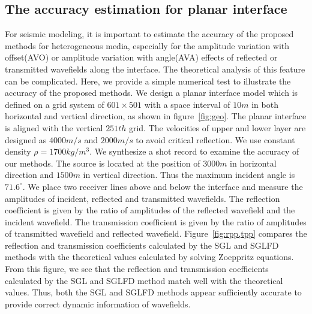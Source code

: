 \subsection{The accuracy estimation for planar interface}
For seismic modeling, it is important to estimate the accuracy of the proposed methods for heterogeneous media, especially for the amplitude variation with offset(AVO) or amplitude variation with angle(AVA) effects of reflected or transmitted wavefields along the interface. The theoretical analysis of this feature can be complicated. Here, we provide a simple numerical test to illustrate the accuracy of the proposed methods. We design a planar interface model which is defined on a grid system of $601\times501$ with a space interval of $10m$ in both horizontal and vertical direction, as shown in figure~\ref{fig:geo}. The planar interface is aligned with the vertical $251th$ grid. The velocities of upper and lower layer are designed as $4000m/s$ and $2000m/s$ to avoid critical reflection. We use constant density $\rho=1700 kg/m^3$. We synthesize a shot record to examine the accuracy of our methods. The source is located at the position of $3000m$ in horizontal direction and $1500m$ in vertical direction. Thus the maximum incident angle is $71.6^{\circ}$. We place two receiver lines above and below the interface and measure the amplitudes of incident, reflected and transmitted wavefields. The reflection coefficient is given by the ratio of amplitudes of the reflected wavefield and the incident wavefield. The transmission coefficient is given by the ratio of amplitudes of transmitted wavefield and reflected wavefield. Figure~\ref{fig:rpp,tpp} compares the reflection and transmission coefficients calculated by the SGL and SGLFD methods with the theoretical values calculated by solving Zoeppritz equations. From this figure, we see that the reflection and transmission coefficients calculated by the SGL and SGLFD method match well with the theoretical values. Thus, both the SGL and SGLFD methods appear sufficiently accurate to provide correct dynamic information of wavefields.



